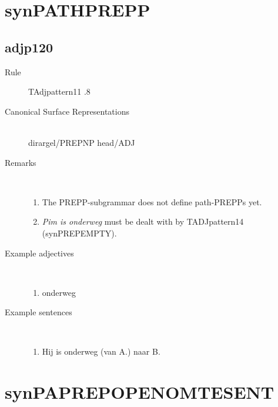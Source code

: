 \section{synPATHPREPP}
  \subsection{adjp120}
\begin{description}
  \item [Rule] TAdjpattern11 .8
  \item [Canonical Surface Representations]\mbox{}\\
 dirargel/PREPNP head/ADJ
  \item [Remarks]  \mbox{}\\ 
\begin{enumerate}
  \item 
The PREPP-subgrammar does not define path-PREPPs yet.
  \item {\em Pim is onderweg} must be  
dealt with by TADJpattern14 (synPREPEMPTY).
\end{enumerate}

  \item [Example adjectives] \mbox{}\\
\begin{enumerate}
  \item onderweg
\end{enumerate}
  \item [Example sentences]\mbox{}\\
\begin{enumerate}
  \item Hij is onderweg (van A.) naar B.
\end{enumerate}
\end{description}
\newpage
\section{synPAPREPOPENOMTESENT}
